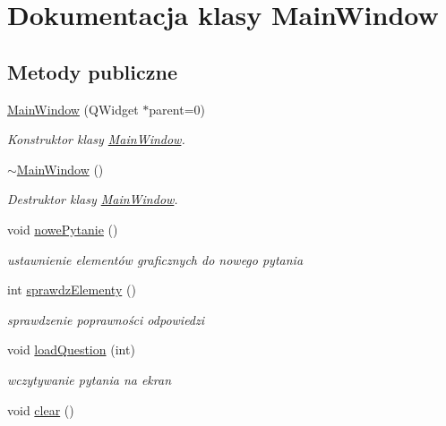 \hypertarget{classMainWindow}{\section{\-Dokumentacja klasy \-Main\-Window}
\label{classMainWindow}
}
\subsection*{\-Metody publiczne}
\begin{DoxyCompactItemize}
\item 
\hypertarget{classMainWindow_a8b244be8b7b7db1b08de2a2acb9409db}{\hyperlink{classMainWindow_a8b244be8b7b7db1b08de2a2acb9409db}{\-Main\-Window} (\-Q\-Widget $\ast$parent=0)}\label{classMainWindow_a8b244be8b7b7db1b08de2a2acb9409db}

\begin{DoxyCompactList}\small\item\em \-Konstruktor klasy \hyperlink{classMainWindow}{\-Main\-Window}. \end{DoxyCompactList}\item 
\hypertarget{classMainWindow_ae98d00a93bc118200eeef9f9bba1dba7}{\hyperlink{classMainWindow_ae98d00a93bc118200eeef9f9bba1dba7}{$\sim$\-Main\-Window} ()}\label{classMainWindow_ae98d00a93bc118200eeef9f9bba1dba7}

\begin{DoxyCompactList}\small\item\em \-Destruktor klasy \hyperlink{classMainWindow}{\-Main\-Window}. \end{DoxyCompactList}\item 
\hypertarget{classMainWindow_a22d3a8a92e9a122cba7667f9757867dd}{void \hyperlink{classMainWindow_a22d3a8a92e9a122cba7667f9757867dd}{nowe\-Pytanie} ()}\label{classMainWindow_a22d3a8a92e9a122cba7667f9757867dd}

\begin{DoxyCompactList}\small\item\em ustawnienie elementów graficznych do nowego pytania \end{DoxyCompactList}\item 
int \hyperlink{classMainWindow_a2328008849514712c663c21b2459fb3a}{sprawdz\-Elementy} ()
\begin{DoxyCompactList}\small\item\em sprawdzenie poprawności odpowiedzi \end{DoxyCompactList}\item 
void \hyperlink{classMainWindow_a566c91cfbb83c75e0ff2d9e6fafbe013}{load\-Question} (int)
\begin{DoxyCompactList}\small\item\em wczytywanie pytania na ekran \end{DoxyCompactList}\item 
\hypertarget{classMainWindow_aa787c9a816550a846e9d26d503ea03d3}{void \hyperlink{classMainWindow_aa787c9a816550a846e9d26d503ea03d3}{clear} ()}\label{classMainWindow_aa787c9a816550a846e9d26d503ea03d3}


\end{DoxyCompactItemize}
